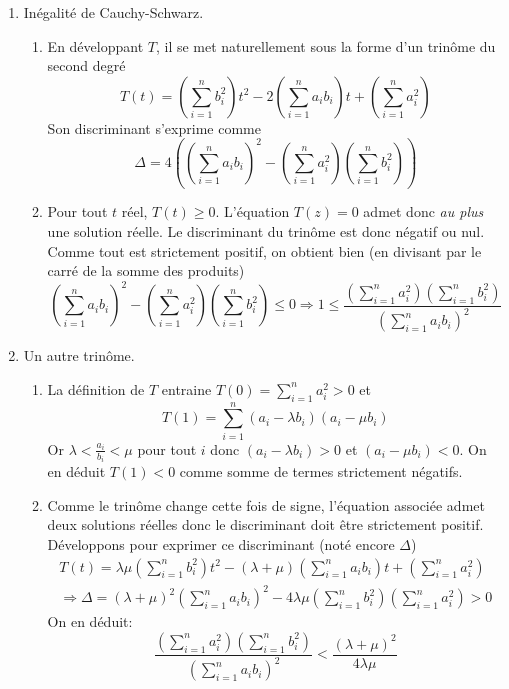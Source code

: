 \begin{enumerate}
  \item Inégalité de Cauchy-Schwarz.
\begin{enumerate}
  \item En développant $T$, il se met naturellement sous la forme d'un trinôme du second degré
\begin{displaymath}
  T(t) = \left( \sum_{i=1}^nb_i^2\right)t^2 -2\left( \sum_{i=1}^na_ib_i\right)t + \left( \sum_{i=1}^na_i^2\right) 
\end{displaymath}
Son discriminant s'exprime comme
\begin{displaymath}
  \Delta = 4\left( \left( \sum_{i=1}^na_ib_i\right)^2 - \left( \sum_{i=1}^na_i^2\right)\left( \sum_{i=1}^nb_i^2\right)\right) 
\end{displaymath}

  \item Pour tout $t$ réel, $T(t)\geq 0$. L'équation $T(z)=0$ admet donc \emph{au plus} une solution réelle. Le discriminant du trinôme est donc négatif ou nul. Comme tout est strictement positif, on obtient bien (en divisant par le carré de la somme des produits)
\begin{displaymath}
\left( \sum_{i=1}^na_ib_i\right)^2 - \left( \sum_{i=1}^na_i^2\right)\left( \sum_{i=1}^nb_i^2\right)\leq 0
\Rightarrow
1 \leq \frac{\left( \sum_{i=1}^na_i^2\right)\left( \sum_{i=1}^nb_i^2\right)}{\left( \sum_{i=1}^na_ib_i\right)^2}
\end{displaymath}

\end{enumerate}
  \item Un autre trinôme.
\begin{enumerate}
  \item La définition de $T$ entraine $T(0) = \sum_{i=1}^{n}a_i^2 > 0$ et 
  \begin{displaymath}
T(1) = \sum_{i=1}^{n}(a_i-\lambda b_i)(a_i-\mu b_i)
  \end{displaymath}
Or $\lambda < \frac{a_i}{b_i} < \mu$ pour tout $i$ donc $(a_i-\lambda b_i)> 0$ et $(a_i-\mu b_i)< 0$. On en déduit $T(1)< 0$ comme somme de termes strictement négatifs.
  \item Comme le trinôme change cette fois de signe, l'équation associée admet deux solutions réelles donc le discriminant doit être strictement positif. Développons pour exprimer ce discriminant (noté encore $\Delta$)
\begin{multline*}
T(t) = \lambda \mu\left( \sum_{i=1}^{n}b_i^2\right)t^2 -(\lambda + \mu)\left( \sum_{i=1}^{n}a_ib_i\right)t + \left( \sum_{i=1}^{n}a_i^2\right) \\
\Rightarrow
\Delta = (\lambda + \mu)^2\left( \sum_{i=1}^{n}a_ib_i\right)^2 -4\lambda \mu\left( \sum_{i=1}^{n}b_i^2\right)\left( \sum_{i=1}^{n}a_i^2\right)>0
\end{multline*}
On en déduit:
\begin{displaymath}
\frac{\left( \sum_{i=1}^{n}a_i^2\right)\left( \sum_{i=1}^{n}b_i^2\right)}{\left( \sum_{i=1}^{n}a_ib_i\right)^2}<\frac{(\lambda + \mu)^2}{4\lambda \mu}  
\end{displaymath}


\end{enumerate}
\end{enumerate}
